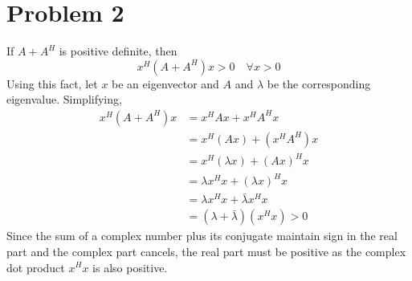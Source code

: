 \documentclass{article}
\begin{document}
\section*{Problem 2}

If $A + A^H$ is positive definite, then
$$ x^H \left(A + A^H\right) x > 0\quad \forall x > 0 $$
Using this fact, let $x$ be an eigenvector and $A$ and $\lambda$ be the
corresponding eigenvalue. Simplifying,
\begin{align*}
  x^H \left(A + A^H\right) x &= x^H A x + x^H A^H x \\
  &= x^H \left(A x\right) + \left(x^H A^H\right) x \\
  &= x^H \left(\lambda x\right) + \left(A x\right)^H x \\
  &= \lambda x^H x + \left(\lambda x\right)^H x \\
  &= \lambda x^H x + \bar{\lambda} x^H x \\
  &= \left(\lambda + \bar{\lambda}\right) \left(x^H x\right) > 0
\end{align*}
Since the sum of a complex number plus its conjugate maintain sign in the
real part and the complex part cancels, the real part must be positive as the
complex dot product $x^H x$ is also positive.
\end{document}
